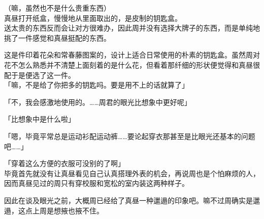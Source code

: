 （嘛，虽然也不是什么贵重东西）\\

真昼打开纸盒，慢慢地从里面取出的，是皮制的钥匙盒。\\

送太贵的东西反而会让对方很难办，因此周并没有选择大牌子的东西，而是单纯地挑了一件感觉和真昼挺配的东西。

这是件印着花朵和常春藤图案的，设计上适合日常使用的朴素的钥匙盒。虽然周对花不怎么熟悉并不清楚上面刻着的是什么花，但看着那纤细的形状便觉得和真昼很配于是便选了这一件。\\

「嘛，不是给了你把多的钥匙吗。要是用不上的话就算了」

「不，我会感激地使用的。……周君的眼光比想象中更好呢」

「比想象中是什么啦」

「嗯，毕竟平常总是运动衫配运动裤……要论起穿衣那甚至是比眼光还基本的问题吧……」

「穿着这么方便的衣服可没别的了啊」\\

毕竟首先就没有让真昼看见自己认真搭理外表的机会，再说周也是个怕麻烦的人，因而真昼见过的周只有穿校服和宽松的室内装这两种样子。

因此在谈及眼光之前，大概周已经给了真昼一种邋遢的印象吧。嘛不过周确实是邋遢，这点上周是想掖也掖不住。\\

